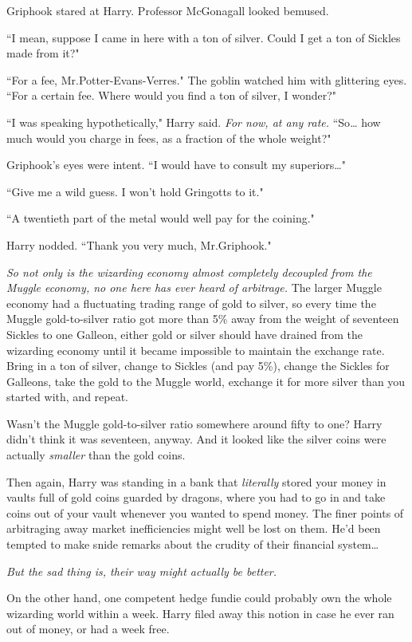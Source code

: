 Griphook stared at Harry. Professor McGonagall looked bemused.

``I mean, suppose I came in here with a ton of silver. Could I get a ton of Sickles made from it?"

``For a fee, Mr.\?Potter-Evans-Verres." The goblin watched him with glittering eyes. ``For a certain fee. Where would you find a ton of silver, I wonder?"

``I was speaking hypothetically," Harry said. \emph{For now, at any rate.} ``So{\ldots} how much would you charge in fees, as a fraction of the whole weight?"

Griphook's eyes were intent. ``I would have to consult my superiors{\ldots}"

``Give me a wild guess. I won't hold Gringotts to it."

``A twentieth part of the metal would well pay for the coining."

Harry nodded. ``Thank you very much, Mr.\?Griphook."

\emph{So not only is the wizarding economy almost completely decoupled from the Muggle economy, no one here has ever heard of arbitrage.} The larger Muggle economy had a fluctuating trading range of gold to silver, so every time the Muggle gold-to-silver ratio got more than 5\% away from the weight of seventeen Sickles to one Galleon, either gold or silver should have drained from the wizarding economy until it became impossible to maintain the exchange rate. Bring in a ton of silver, change to Sickles (and pay 5\%), change the Sickles for Galleons, take the gold to the Muggle world, exchange it for more silver than you started with, and repeat.

Wasn't the Muggle gold-to-silver ratio somewhere around fifty to one? Harry didn't think it was seventeen, anyway. And it looked like the silver coins were actually \emph{smaller} than the gold coins.

Then again, Harry was standing in a bank that \emph{literally} stored your money in vaults full of gold coins guarded by dragons, where you had to go in and take coins out of your vault whenever you wanted to spend money. The finer points of arbitraging away market inefficiencies might well be lost on them. He'd been tempted to make snide remarks about the crudity of their financial system{\ldots}

\emph{But the sad thing is, their way might actually be better.}

On the other hand, one competent hedge fundie could probably own the whole wizarding world within a week. Harry filed away this notion in case he ever ran out of money, or had a week free.

